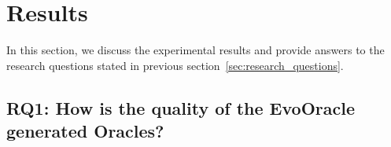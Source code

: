 \begin{itemize}
    
    
\end{itemize}

\section{Results}
\label{sec:results}
\vspace{0.2 cm}

In this section, we discuss the experimental results and provide answers to the research questions stated in previous section~\ref{sec:research_questions}.

\vspace{0.1 cm}
\subsection{RQ1: How is the quality of the EvoOracle generated Oracles?}
\label{sec:results_rq1}
\vspace{0.1 cm}

